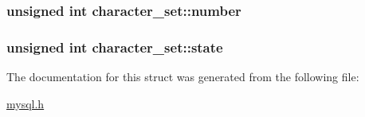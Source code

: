 \subsubsection[{number}]{\setlength{\rightskip}{0pt plus 5cm}unsigned int character\+\_\+set\+::number}\label{structcharacter__set_a703a5afa7f12943ff4e5045571830bd6}
\hypertarget{structcharacter__set_aa8979576a32a17e6822feada26528e38}{}
\subsubsection[{state}]{\setlength{\rightskip}{0pt plus 5cm}unsigned int character\+\_\+set\+::state}\label{structcharacter__set_aa8979576a32a17e6822feada26528e38}


The documentation for this struct was generated from the following file\+:\begin{DoxyCompactItemize}
\item 
\hyperlink{mysql_8h}{mysql.\+h}\end{DoxyCompactItemize}
